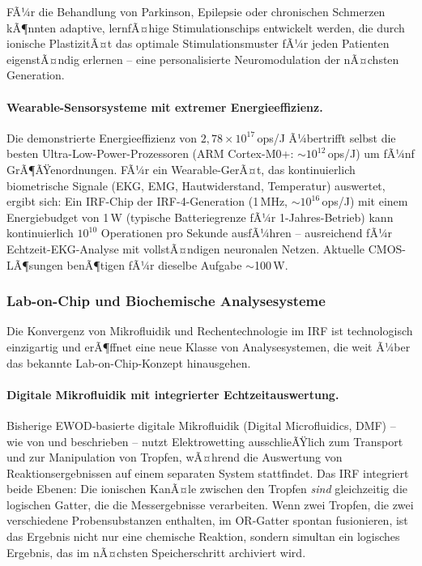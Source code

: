 ﻿\documentclass[a4paper,12pt]{scrreprt}
\theoremstyle{definition}
\begin{document}
FÃ¼r die Behandlung von Parkinson, Epilepsie oder chronischen Schmerzen
kÃ¶nnten adaptive, lernfÃ¤hige Stimulationschips entwickelt werden, die
durch ionische PlastizitÃ¤t das optimale Stimulationsmuster fÃ¼r jeden
Patienten eigenstÃ¤ndig erlernen -- eine personalisierte Neuromodulation
der nÃ¤chsten Generation.

\paragraph{Wearable-Sensorsysteme mit extremer Energieeffizienz.}
Die demonstrierte Energieeffizienz von $2{,}78 \times 10^{17}$\,ops/J Ã¼bertrifft
selbst die besten Ultra-Low-Power-Prozessoren (ARM Cortex-M0+:
$\sim 10^{12}$\,ops/J) um fÃ¼nf GrÃ¶ÃŸenordnungen. FÃ¼r ein Wearable-GerÃ¤t,
das kontinuierlich biometrische Signale (EKG, EMG, Hautwiderstand, Temperatur)
auswertet, ergibt sich: Ein IRF-Chip der IRF-4-Generation (1\,MHz,
$\sim 10^{16}$\,ops/J) mit einem Energiebudget von 1\,\textmu W (typische
Batteriegrenze fÃ¼r 1-Jahres-Betrieb) kann kontinuierlich
$10^{10}$ Operationen pro Sekunde ausfÃ¼hren -- ausreichend fÃ¼r Echtzeit-EKG-Analyse
mit vollstÃ¤ndigen neuronalen Netzen. Aktuelle CMOS-LÃ¶sungen benÃ¶tigen
fÃ¼r dieselbe Aufgabe $\sim$100\,\textmu W.

\subsubsection{Lab-on-Chip und Biochemische Analysesysteme}
\label{subsubsec:lab_on_chip}

Die Konvergenz von Mikrofluidik und Rechentechnologie im IRF ist technologisch
einzigartig und erÃ¶ffnet eine neue Klasse von Analysesystemen, die weit
Ã¼ber das bekannte Lab-on-Chip-Konzept hinausgehen.

\paragraph{Digitale Mikrofluidik mit integrierter Echtzeitauswertung.}
Bisherige EWOD-basierte digitale Mikrofluidik (Digital Microfluidics, DMF)
-- wie von \cite{cho2003} und \cite{fair2007} beschrieben --
nutzt Elektrowetting ausschlieÃŸlich zum Transport und zur Manipulation von
Tropfen, wÃ¤hrend die Auswertung von Reaktionsergebnissen auf einem separaten
System stattfindet. Das IRF integriert beide Ebenen: Die ionischen KanÃ¤le
zwischen den Tropfen \emph{sind} gleichzeitig die logischen Gatter, die
die Messergebnisse verarbeiten. Wenn zwei Tropfen, die zwei verschiedene
Probensubstanzen enthalten, im OR-Gatter spontan fusionieren, ist das
Ergebnis nicht nur eine chemische Reaktion, sondern simultan ein
logisches Ergebnis, das im nÃ¤chsten Speicherschritt archiviert wird.
\end{document}
